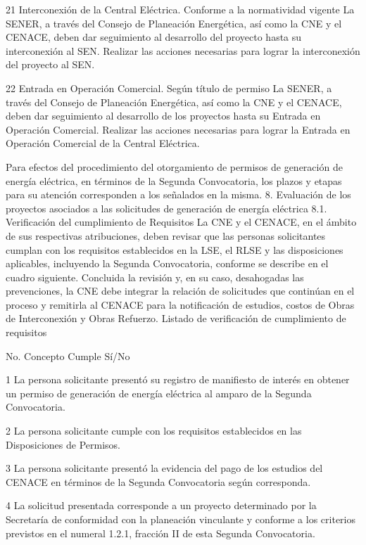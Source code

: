  21
 Interconexión de la Central Eléctrica.
 Conforme a la normatividad vigente
 La SENER, a través del Consejo de Planeación Energética, así como la CNE y el CENACE, deben dar seguimiento al desarrollo del proyecto hasta su interconexión al SEN.
 Realizar las acciones necesarias para lograr la interconexión del proyecto al SEN.
 
 22
 Entrada en Operación Comercial.
 Según título de permiso
 La SENER, a través del Consejo de Planeación Energética, así como la CNE y el CENACE, deben dar seguimiento al desarrollo de los proyectos hasta su Entrada en Operación Comercial.
 Realizar las acciones necesarias para lograr la Entrada en Operación Comercial de la Central Eléctrica.
 
 
Para efectos del procedimiento del otorgamiento de permisos de generación de energía eléctrica, en términos de la Segunda Convocatoria, los plazos y etapas para su atención corresponden a los señalados en la misma.
8. Evaluación de los proyectos asociados a las solicitudes de generación de energía eléctrica
8.1. Verificación del cumplimiento de Requisitos
La CNE y el CENACE, en el ámbito de sus respectivas atribuciones, deben revisar que las personas solicitantes cumplan con los requisitos establecidos en la LSE, el RLSE y las disposiciones aplicables, incluyendo la Segunda Convocatoria, conforme se describe en el cuadro siguiente. Concluida la revisión y, en su caso, desahogadas las prevenciones, la CNE debe integrar la relación de solicitudes que continúan en el proceso y remitirla al CENACE para la notificación de estudios, costos de Obras de Interconexión y Obras Refuerzo.
Listado de verificación de cumplimiento de requisitos
 
 No.
 Concepto
 Cumple
Sí/No
 
 1
 La persona solicitante presentó su registro de manifiesto de interés en obtener un permiso de generación de energía eléctrica al amparo de la Segunda Convocatoria.
 
 
 2
 La persona solicitante cumple con los requisitos establecidos en las Disposiciones de Permisos.
 
 
 3
 La persona solicitante presentó la evidencia del pago de los estudios del CENACE en términos de la Segunda Convocatoria según corresponda.
 
 
 4
 La solicitud presentada corresponde a un proyecto determinado por la Secretaría de conformidad con la planeación vinculante y conforme a los criterios previstos en el numeral 1.2.1, fracción II de esta Segunda Convocatoria.
 
